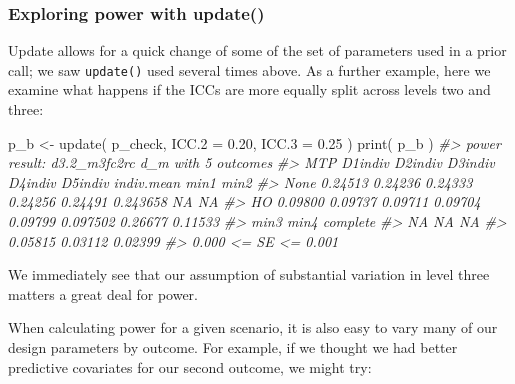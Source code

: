 \documentclass{article}
\newenvironment{Shaded}{\begin{snugshade}}{\end{snugshade}}
\newcommand{\AttributeTok}[1]{\textcolor[rgb]{0.77,0.63,0.00}{#1}}
\newcommand{\CommentTok}[1]{\textcolor[rgb]{0.56,0.35,0.01}{\textit{#1}}}
\newcommand{\FloatTok}[1]{\textcolor[rgb]{0.00,0.00,0.81}{#1}}
\newcommand{\FunctionTok}[1]{\textcolor[rgb]{0.00,0.00,0.00}{#1}}
\newcommand{\NormalTok}[1]{#1}
\newcommand{\OtherTok}[1]{\textcolor[rgb]{0.56,0.35,0.01}{#1}}
\begin{document}
\subsubsection{Exploring power with update()}

Update allows for a quick change of some of the set of parameters used
in a prior call; we saw \texttt{update()} used several times above. As a
further example, here we examine what happens if the ICCs are more
equally split across levels two and three:

\begin{Shaded}
\begin{Highlighting}[]
\NormalTok{p\_b }\OtherTok{\textless{}{-}} \FunctionTok{update}\NormalTok{( p\_check, }\AttributeTok{ICC.2 =} \FloatTok{0.20}\NormalTok{, }\AttributeTok{ICC.3 =} \FloatTok{0.25}\NormalTok{ )}
\FunctionTok{print}\NormalTok{( p\_b )}
\CommentTok{\#\textgreater{} power result: d3.2\_m3fc2rc d\_m with 5 outcomes}
\CommentTok{\#\textgreater{}   MTP D1indiv D2indiv D3indiv D4indiv D5indiv indiv.mean    min1    min2}
\CommentTok{\#\textgreater{}  None 0.24513 0.24236 0.24333 0.24256 0.24491   0.243658      NA      NA}
\CommentTok{\#\textgreater{}    HO 0.09800 0.09737 0.09711 0.09704 0.09799   0.097502 0.26677 0.11533}
\CommentTok{\#\textgreater{}     min3    min4 complete}
\CommentTok{\#\textgreater{}       NA      NA       NA}
\CommentTok{\#\textgreater{}  0.05815 0.03112  0.02399}
\CommentTok{\#\textgreater{}  0.000 \textless{}= SE \textless{}= 0.001}
\end{Highlighting}
\end{Shaded}

We immediately see that our assumption of substantial variation in level
three matters a great deal for power.

When calculating power for a given scenario, it is also easy to vary
many of our design parameters by outcome. For example, if we thought we
had better predictive covariates for our second outcome, we might try:
\end{document}
